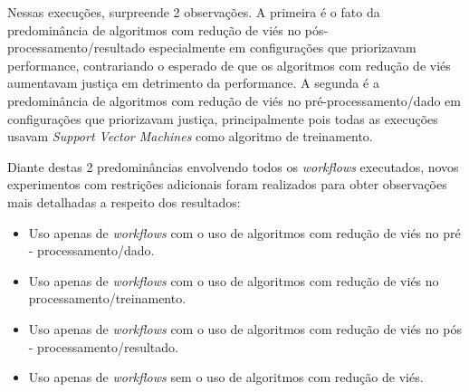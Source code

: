 \documentclass[twocolumn]{article}
\begin{document}
\begin{table}[H]
\begin{center}
  \caption{Melhores opções escolhidas pelo modelo MAPE-K \\ Todos os métodos - 25\% Performance/75\% Fairness}
\label{tbl:ScoreMAPEKGeral2575}
\end{center}
\end{table}

Nessas execuções, surpreende 2 observações. A primeira é o fato da predominância de algoritmos com redução de viés no pós-processamento/resultado especialmente em configurações que priorizavam performance, contrariando o esperado de que os algoritmos com redução de viés aumentavam justiça em detrimento da performance. A segunda é a predominância de algoritmos com redução de viés no pré-processamento/dado em configurações que priorizavam justiça, principalmente pois todas as execuções usavam \textit{Support Vector Machines} como algoritmo de treinamento.

Diante destas 2 predominâncias envolvendo todos os \textit{workflows} executados, novos experimentos com restrições adicionais foram realizados para obter observações mais detalhadas a respeito dos resultados:

\begin{itemize}
\item Uso apenas de \textit{workflows} com o uso de algoritmos com redução de viés no pré - processamento/dado.
\item Uso apenas de \textit{workflows} com o uso de algoritmos com redução de viés no processamento/treinamento.
\item Uso apenas de \textit{workflows} com o uso de algoritmos com redução de viés no pós - processamento/resultado.
\item Uso apenas de \textit{workflows} sem o uso de algoritmos com redução de viés.
\end{itemize}
\end{document}
